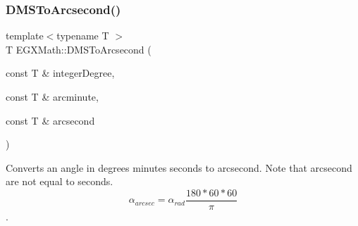 \mbox{\label{group___e_g_x_math-_angle_conversions-_d_m_s_gac9d0871ac2dd889cf9f3c00d25f8a013}} 
\subsubsection{\texorpdfstring{D\+M\+S\+To\+Arcsecond()}{DMSToArcsecond()}}
{\footnotesize\ttfamily template$<$typename T $>$ \\
T E\+G\+X\+Math\+::\+D\+M\+S\+To\+Arcsecond (\begin{DoxyParamCaption}\item[{const T \&}]{integer\+Degree,  }\item[{const T \&}]{arcminute,  }\item[{const T \&}]{arcsecond }\end{DoxyParamCaption})}



Converts an angle in degrees minutes seconds to arcsecond. Note that arcsecond are not equal to seconds. \[\alpha_{arcsec}=\alpha_{rad}\frac{180 * 60 * 60}{\pi}\]. 

